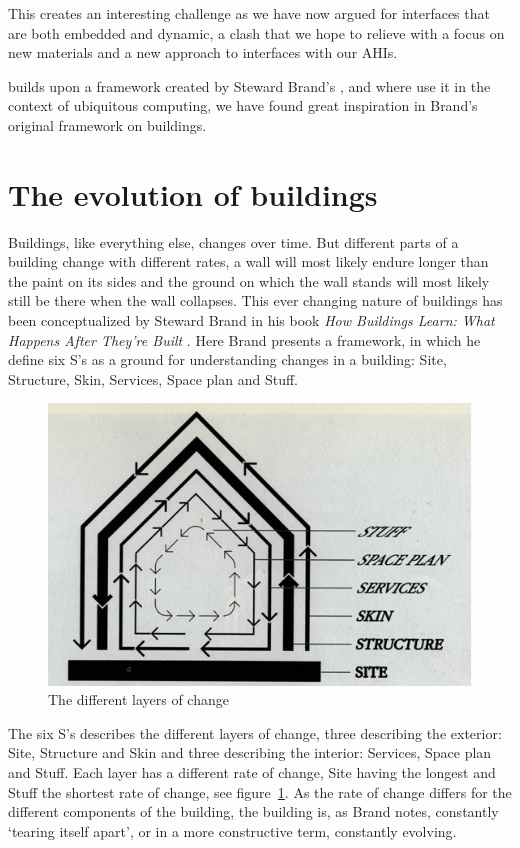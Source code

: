 This creates an interesting challenge as we have now argued for interfaces that are both embedded and dynamic, a clash that we hope to relieve with a focus on new materials and a new approach to interfaces with our AHIs. 

\citet{rodden2003evolution} builds upon a framework created by Steward Brand's \citep{brand1995buildings}, and where \citeauthor{rodden2003evolution} use it in the context of ubiquitous computing, we have found great inspiration in Brand's original framework on buildings.

\section{The evolution of buildings}
Buildings, like everything else, changes over time.
But different parts of a building change with different rates, a wall will most likely endure longer than the paint on its sides and the ground on which the wall stands will most likely still be there when the wall collapses.
This ever changing nature of buildings has been conceptualized by Steward Brand in his book \emph{How Buildings Learn: What Happens After They're Built} \citep{brand1995buildings}.
Here Brand presents a framework, in which he define six S's as a ground for understanding changes in a building: Site, Structure, Skin, Services, Space plan and Stuff.

\begin{figure}[h]
	\centering
  		\includegraphics[width=.9\textwidth]{figures/brand-diagram}
	\caption{The different layers of change \citep[chapter 2]{brand1995buildings}}
   \label{brand-diagram}
\end{figure}

The six S's describes the different layers of change, three describing the exterior: Site, Structure and Skin and three describing the interior: Services, Space plan and Stuff.
Each layer has a different rate of change, Site having the longest and Stuff the shortest rate of change, see figure~\ref{brand-diagram}.
As the rate of change differs for the different components of the building, the building is, as Brand notes, constantly `tearing itself apart', or in a more constructive term, constantly evolving.

